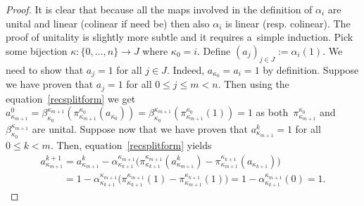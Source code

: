 \documentclass[pdftex]{sigma}
\begin{document}
\begin{proof}
It is clear that because all the maps involved in the def\/inition of $\alpha_i$ are unital and linear (colinear if need
be) then also $\alpha_i$ is linear (resp.
colinear).
The proof of unitality is slightly more subtle and it requires a~simple induction.
Pick some bijection $\kappa:\{0,\ldots,n\}\rightarrow J$ where $\kappa_0=i$.
Def\/ine $(a_j)_{j\in J}:=\alpha_i(1)$.
We need to show that $a_j=1$ for all $j\in J$.
Indeed, $a_{\kappa_0}=a_i=1$ by def\/inition.
Suppose we have proven that $a_j=1$ for all $0\leq j\leq m<n$.
Then using the equation~\eqref{recsplitform} we get
$a^0_{\kappa_{m+1}}=\beta^{\kappa_{m+1}}_{\kappa_0}(\pi^{\kappa_0}_{\kappa_{m+1}}(a_{\kappa_0}))=
\beta^{\kappa_{m+1}}_{\kappa_0}(\pi^{\kappa_0}_{\kappa_{m+1}}(1))=1$ as both~$\pi^{\kappa_0}_{\kappa_{m+1}}$ and~$\beta^{\kappa_{m+1}}_{\kappa_0}$ are unital.
Suppose now that we have proven that $a^k_{\kappa_{m+1}}=1$ for all $0\leq k<m$.
Then, equation~\eqref{recsplitform} yields
\begin{gather*}
a^{k+1}_{\kappa_{m+1}}
=a_{\kappa_{m+1}}^k-\alpha^{\kappa_{m+1}}_{\kappa_{k+1}}
\big(\pi^{\kappa_{m+1}}_{\kappa_{k+1}}(a^k_{\kappa_{m+1}})-\pi^{\kappa_{k+1}}_{\kappa_{m+1}}(a_{\kappa_{k+1}})\big)
\\
\phantom{a^{k+1}_{\kappa_{m+1}}}
 =1 -\alpha^{\kappa_{m+1}}_{\kappa_{k+1}}\big(\pi^{\kappa_{m+1}}_{\kappa_{k+1}}(1)-\pi^{\kappa_{k+1}}_{\kappa_{m+1}}(1)\big)
 =1-\alpha^{\kappa_{m+1}}_{\kappa_{k+1}}(0)
 =1.
\end{gather*}


\end{proof}
\end{document}
